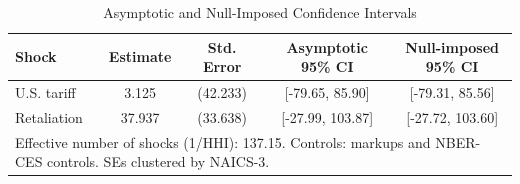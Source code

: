 \begin{table}[!htbp] \centering
  \caption{Asymptotic and Null-Imposed Confidence Intervals}
  \label{tab:robust_cis}
\begin{tabular}{lcccc}
\hline \hline
Shock & Estimate & Std. Error & Asymptotic 95\% CI & Null-imposed 95\% CI \\
\hline
U.S. tariff & 3.125 & (42.233) & [-79.65, 85.90] & [-79.31, 85.56] \\
Retaliation & 37.937 & (33.638) & [-27.99, 103.87] & [-27.72, 103.60] \\
\hline
\multicolumn{5}{l}{\footnotesize Effective number of shocks (1/HHI): 137.15. Controls: markups and NBER-CES controls. SEs clustered by NAICS-3.} \\
\hline \hline
\end{tabular}
\end{table}
